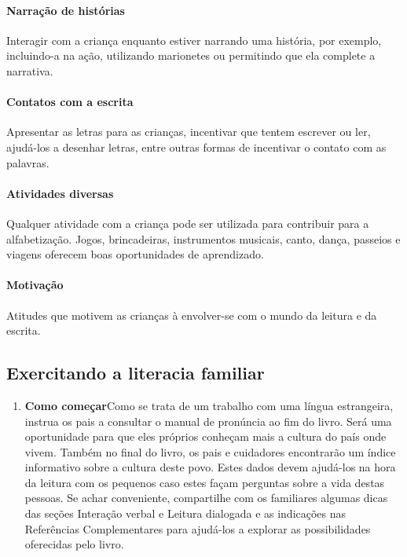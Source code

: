 \documentclass[11pt]{extarticle}
\begin{document}
{{\paragraph{Narração de histórias} Interagir com a criança enquanto 
estiver narrando uma história, por exemplo, incluindo-a na ação, utilizando 
marionetes ou permitindo que ela complete a narrativa.

\paragraph{Contatos com a escrita} Apresentar as letras para as 
crianças, incentivar que tentem escrever ou ler, ajudá-los a desenhar letras, 
entre outras formas de incentivar o contato com as palavras.

\paragraph{Atividades diversas} Qualquer atividade com a criança 
pode ser utilizada para contribuir para a alfabetização. Jogos, brincadeiras, 
instrumentos musicais, canto, dança, passeios e viagens oferecem boas 
oportunidades de aprendizado.

\paragraph{Motivação} Atitudes que motivem as crianças à envolver-se com 
o mundo da leitura e da escrita.

\subsection{Exercitando a literacia familiar}


\begin{enumerate}
\item \textbf{Como começar}\quad Como se trata de um trabalho com
uma língua estrangeira, instrua os pais a consultar o manual de 
pronúncia ao fim do livro. Será uma oportunidade para que eles
próprios conheçam mais a cultura do país onde vivem. Também no final do livro,
os pais e cuidadores encontrarão um índice informativo sobre a cultura deste povo.
Estes dados devem ajudá-los na hora da leitura com os pequenos caso estes 
façam perguntas sobre a vida destas pessoas. Se achar conveniente, compartilhe com 
os familiares algumas dicas das seções Interação verbal 
e Leitura dialogada e as indicações nas Referências Complementares 
para ajudá-los a explorar as possibilidades oferecidas pelo livro. 


\end{enumerate}}}
\end{document}
